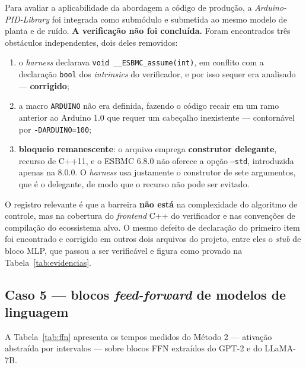 Para avaliar a aplicabilidade da abordagem a código de produção, a
\textit{Arduino-PID-Library} foi integrada como submódulo e submetida ao mesmo modelo de
planta e de ruído. \textbf{A verificação não foi concluída.} Foram encontrados três
obstáculos independentes, dois deles removidos:

\begin{enumerate}[leftmargin=1.4cm]
  \item o \textit{harness} declarava \texttt{void \_\_ESBMC\_assume(int)}, em conflito com a
  declaração \texttt{bool} dos \textit{intrinsics} do verificador, e por isso sequer era
  analisado --- \textbf{corrigido};
  \item a macro \texttt{ARDUINO} não era definida, fazendo o código recair em um ramo anterior
  ao Arduino 1.0 que requer um cabeçalho inexistente --- contornável por
  \texttt{-DARDUINO=100};
  \item \textbf{bloqueio remanescente}: o arquivo emprega \textbf{construtor delegante},
  recurso de C++11, e o ESBMC 6.8.0 não oferece a opção \texttt{--std}, introduzida apenas na
  8.0.0. O \textit{harness} usa justamente o construtor de sete argumentos, que é o delegante,
  de modo que o recurso não pode ser evitado.
\end{enumerate}

O registro relevante é que a barreira \textbf{não está} na complexidade do algoritmo de
controle, mas na cobertura do \textit{frontend} C++ do verificador e nas convenções de
compilação do ecossistema alvo. O mesmo defeito de declaração do primeiro item foi encontrado
e corrigido em outros dois arquivos do projeto, entre eles o \textit{stub} de bloco MLP, que
passou a ser verificável e figura como provado na Tabela~\ref{tab:evidencias}.

\subsection{Caso 5 --- blocos \textit{feed-forward} de modelos de linguagem}

A Tabela~\ref{tab:ffn} apresenta os tempos medidos do Método 2 --- ativação abstraída por
intervalos --- sobre blocos FFN extraídos do GPT-2 e do LLaMA-7B.

